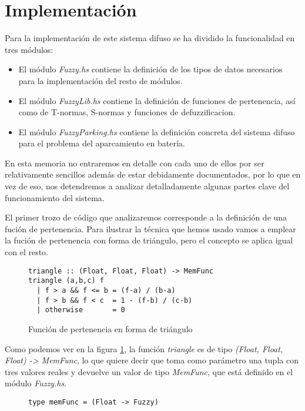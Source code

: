 \section{Implementación}
Para la implementación de este sistema difuso se ha dividido la
funcionalidad en tres módulos:

\begin{itemize}
\item El módulo \emph{Fuzzy.hs} contiene la definición de los tipos de
  datos necesarios para la implementación del resto de módulos.
\item El módulo \emph{FuzzyLib.hs} contiene la definición de
  funciones de pertenencia, así como de T-normas, S-normas y funciones
  de defuzzificacion.
\item El módulo \emph{FuzzyParking.hs} contiene la definición concreta
  del sistema difuso para el problema del aparcamiento en batería.
\end{itemize}

En esta memoria no entraremos en detalle con cada uno de ellos por ser
relativamente sencillos además de estar debidamente documentados, por
lo que en vez de eso, nos detendremos a analizar detalladamente
algunas partes clave del funcionamiento del sistema.

El primer trozo de código que analizaremos corresponde a la definición
de una fución de pertenencia. Para ilustrar la técnica que hemos usado
vamos a emplear la fución de pertenencia con forma de triángulo, pero
el concepto se aplica igual con el resto.

\begin{figure}
\begin{lstlisting}
triangle :: (Float, Float, Float) -> MemFunc
triangle (a,b,c) f
  | f > a && f <= b = (f-a) / (b-a)
  | f > b && f < c  = 1 - (f-b) / (c-b)
  | otherwise       = 0
\end{lstlisting}
\caption{Función de pertenencia en forma de triángulo}
\label{code:codigo1}
\end{figure}

Como podemos ver en la figura \ref{code:codigo1}, la función
\emph{triangle} es de tipo \emph{(Float, Float, Float) -> MemFunc}, lo
que quiere decir que toma como parámetro una tupla con tres valores
reales y devuelve un valor de tipo \emph{MemFunc}, que está definido
en el módulo \emph{Fuzzy.hs}.

\begin{figure}
\begin{lstlisting}
type memFunc = (Float -> Fuzzy)
\end{lstlisting}
\label{code:codigo2}
\end{figure}

